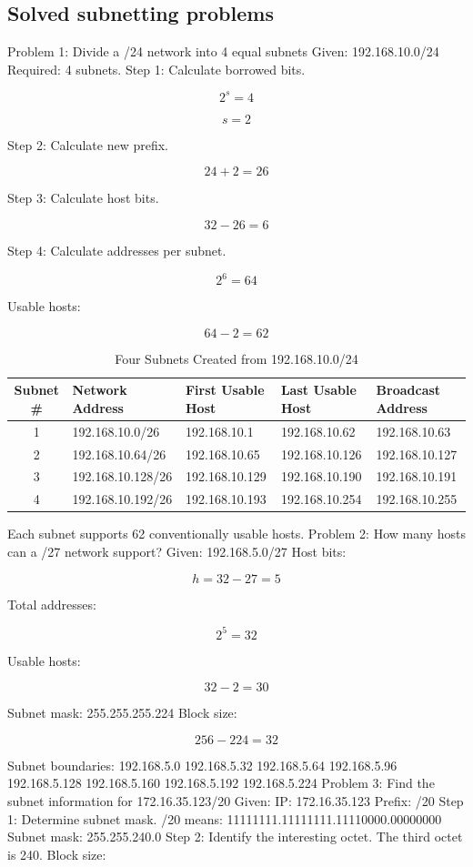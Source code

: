 \subsection{Solved subnetting problems}
Problem 1: Divide a /24 network into 4 equal subnets
Given:
192.168.10.0/24
Required: 4 subnets.
Step 1: Calculate borrowed bits.

\[
2^s=4
\]


\[
s=2
\]

Step 2: Calculate new prefix.

\[
24+2=26
\]

Step 3: Calculate host bits.

\[
32-26=6
\]

Step 4: Calculate addresses per subnet.

\[
2^6=64
\]

Usable hosts:

\[
64-2=62
\]

\begin{table}[htbp]
\centering
\caption{Four Subnets Created from 192.168.10.0/24}
\label{tab:prob1_subnets}
\begin{tabularx}{\textwidth}{c X X X X}
\toprule
\textbf{Subnet \#} & \textbf{Network Address} & \textbf{First Usable Host} & \textbf{Last Usable Host} & \textbf{Broadcast Address} \\
\midrule
1 & 192.168.10.0/26   & 192.168.10.1   & 192.168.10.62  & 192.168.10.63 \\
2 & 192.168.10.64/26  & 192.168.10.65  & 192.168.10.126 & 192.168.10.127 \\
3 & 192.168.10.128/26 & 192.168.10.129 & 192.168.10.190 & 192.168.10.191 \\
4 & 192.168.10.192/26 & 192.168.10.193 & 192.168.10.254 & 192.168.10.255 \\
\bottomrule
\end{tabularx}
\end{table}
Each subnet supports 62 conventionally usable hosts.
Problem 2: How many hosts can a /27 network support?
Given:
192.168.5.0/27
Host bits:

\[
h=32-27=5
\]

Total addresses:

\[
2^5=32
\]

Usable hosts:

\[
32-2=\boxed{30}
\]

Subnet mask:
255.255.255.224
Block size:

\[
256-224=32
\]

Subnet boundaries:
192.168.5.0
192.168.5.32
192.168.5.64
192.168.5.96
192.168.5.128
192.168.5.160
192.168.5.192
192.168.5.224
Problem 3: Find the subnet information for 172.16.35.123/20
Given:
IP: 172.16.35.123
Prefix: /20
Step 1: Determine subnet mask.
/20 means:
11111111.11111111.11110000.00000000
Subnet mask:
255.255.240.0
Step 2: Identify the interesting octet.
The third octet is 240.
Block size:

